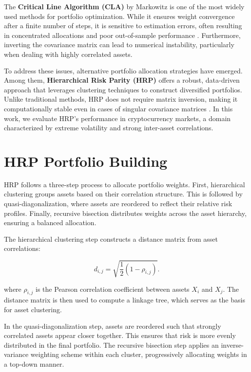 \documentclass[english]{maciarticle}
\begin{document}
The \textbf{Critical Line Algorithm (CLA)} by Markowitz is one of the most widely used methods for portfolio optimization. While it ensures weight convergence after a finite number of steps, it is sensitive to estimation errors, often resulting in concentrated allocations and poor out-of-sample performance \citep{lopez2016}. Furthermore, inverting the covariance matrix can lead to numerical instability, particularly when dealing with highly correlated assets.

To address these issues, alternative portfolio allocation strategies have emerged. Among them, \textbf{Hierarchical Risk Parity (HRP)} offers a robust, data-driven approach that leverages clustering techniques to construct diversified portfolios. Unlike traditional methods, HRP does not require matrix inversion, making it computationally stable even in cases of singular covariance matrices \citep{lopez2018}. In this work, we evaluate HRP’s performance in cryptocurrency markets, a domain characterized by extreme volatility and strong inter-asset correlations.

\section{HRP Portfolio Building}

HRP follows a three-step process to allocate portfolio weights. First, hierarchical clustering groups assets based on their correlation structure. This is followed by quasi-diagonalization, where assets are reordered to reflect their relative risk profiles. Finally, recursive bisection distributes weights across the asset hierarchy, ensuring a balanced allocation.

The hierarchical clustering step constructs a distance matrix from asset correlations:

\[
d_{i,j} = \sqrt{\frac{1}{2}(1 - \rho_{i,j})}.
\]

where \(\rho_{i,j}\) is the Pearson correlation coefficient between assets \(X_i\) and \(X_j\). The distance matrix is then used to compute a linkage tree, which serves as the basis for asset clustering.

In the quasi-diagonalization step, assets are reordered such that strongly correlated assets appear closer together. This ensures that risk is more evenly distributed in the final portfolio. The recursive bisection step applies an inverse-variance weighting scheme within each cluster, progressively allocating weights in a top-down manner.
\end{document}
